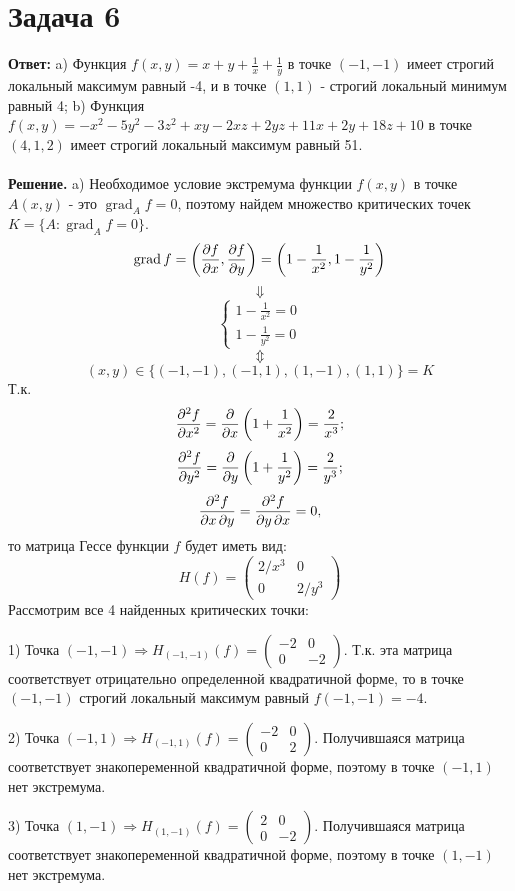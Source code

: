 \documentclass{article}
\DeclareMathOperator{\grad}{grad}
\begin{document}
\section*{Задача 6}
{\bf Ответ:} a) Функция $f(x,y)=x+y+\frac{1}{x}+\frac{1}{y}$ в точке $(-1,-1)$ имеет строгий локальный максимум равный -4, и в точке $(1,1)$ - строгий локальный минимум равный 4; b) Функция $f(x,y)=-x^2-5y^2-3z^2+xy-2xz+2yz+11x+2y+18z+10$ в точке $(4,1,2)$ имеет строгий локальный максимум равный 51.
\\
\\
{\bf Решение.} a) Необходимое условие экстремума функции $f(x,y)$ в точке $A(x,y)$ - это $\grad_A f = 0$, поэтому найдем множество критических точек $K=\{A: \grad_A f=0\}$.
$$\grad f =\left(\pdv{f}{x}, \pdv{f}{y}\right)=\left(1-\frac{1}{x^2}, 1-\frac{1}{y^2}\right)$$
$$\Downarrow$$
\begin{equation*}
 \begin{cases}
   1-\frac{1}{x^2}=0\\
   1-\frac{1}{y^2}=0
 \end{cases}
\end{equation*}
$$\Updownarrow$$
$$(x,y) \in \{(-1,-1), (-1,1), (1, -1), (1, 1)\}=K$$
Т.к. 
$$\pdv[order=2]{f}{x}=\pdv*{\left(1+\frac{1}{x^2}\right)}{x}=\frac{2}{x^3};$$
$$\pdv[order=2]{f}{y}=\pdv*{\left(1+\frac{1}{y^2}\right)}{y}=\frac{2}{y^3};$$
$$\pdv{f}{x,y}=\pdv{f}{y,x}=0,$$
то матрица Гессе функции $f$ будет иметь вид:
$$H(f)=\left(\begin{array}{cc}2/x^3 & 0\\0 & 2/y^3\end{array}\right)$$
Рассмотрим все 4 найденных критических точки:
\par
1) Точка $(-1,-1)\Rightarrow H_{(-1,-1)}(f)=\left(\begin{array}{rr}-2 & 0\\0 & -2\end{array}\right)$. Т.к. эта матрица соответствует отрицательно определенной квадратичной форме, то в точке $(-1,-1)$ строгий локальный максимум равный $f(-1,-1)=-4$.
\par
2) Точка $(-1,1)\Rightarrow H_{(-1,1)}(f)=\left(\begin{array}{rr}-2 & 0\\0 & 2\end{array}\right)$. Получившаяся матрица соответствует знакопеременной квадратичной форме, поэтому в точке $(-1, 1)$ нет экстремума.
\par
3) Точка $(1,-1)\Rightarrow H_{(1,-1)}(f)=\left(\begin{array}{rr}2 & 0\\0 & -2\end{array}\right)$. Получившаяся матрица соответствует знакопеременной квадратичной форме, поэтому в точке $(1, -1)$ нет экстремума.
\end{document}
